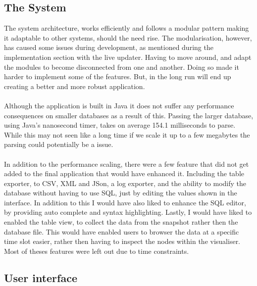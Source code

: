 \subsection{The System}
\label{subsec:system_eval}

The system architecture, works efficiently and follows a modular pattern making it adaptable to other systems, should the need rise. The modularisation, however, has caused some issues during development, as mentioned during the implementation section with the live updater. Having to move around, and adapt the modules to become disconnected from one and another. Doing so made it harder to implement some of the features. But, in the long run will end up creating a better and more robust application.
\\\\
Although the application is built in Java it does not suffer any performance consequences on smaller databases as a result of this. Passing the larger database, using Java's nanosecond timer, takes on average  154.1 milliseconds to parse. While this may not seen like a long time if we scale it up to a few megabytes the parsing could potentially be a issue. 
\\\\
In addition to the performance scaling, there were a few feature that did not get added to the final application that would have enhanced it. Including the table exporter, to CSV, XML and JSon, a log exporter, and the ability to modify the database without having to use SQL, just by editing the values shown in the interface. In addition to this I would have also liked to enhance the SQL editor, by providing  auto complete and syntax highlighting. Lastly, I would have liked to enabled the table view, to collect the data from the snapshot rather then the database file. This would have enabled users to browser the data at a specific time slot easier, rather then having to inspect the nodes within the visualiser.  Most of theses features were left out due to time constraints. 

\subsection{User interface}
\label{subsec:user_interface_eval}

